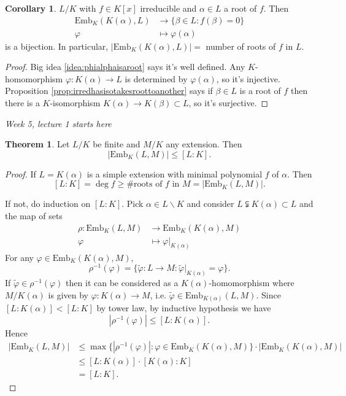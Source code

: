 \documentclass[a4paper]{article}
\newcommand{\emb}{\text{Emb}}
\theoremstyle{definition}
\newtheorem{thm}[defn]{Theorem}
\newtheorem{coro}[defn]{Corollary}
\begin{document}
\begin{coro}
\label{coro:1to1ofembeddingsroots}
$L/K$ with $f\in K[x]$ irreducible and $\alpha\in L$ a root of $f$. Then
\[
\begin{aligned}
\emb_K(K(\alpha),L)&\rightarrow \{\beta\in L:f(\beta)=0\} \\
\varphi&\mapsto\varphi(\alpha)
\end{aligned}
\]
is a bijection. In particular, $|\emb_K(K(\alpha),L)|=$ number of roots of $f$ in $L$.
\end{coro}
\begin{proof}
Big idea \ref{idea:phialphaisaroot} says it's well defined. Any $K$-homomorphism $\varphi:K(\alpha)\rightarrow L$ is determined by $\varphi(\alpha)$, so it's injective. Proposition \ref{prop:irredhasisotakesroottoanother} says if $\beta\in L$ is a root of $f$ then there is a $K$-isomorphism $K(\alpha)\rightarrow K(\beta)\subset L$, so it's surjective.
\end{proof}

\begin{flushright}
\textit{Week 5, lecture 1 starts here}
\end{flushright}

\begin{thm}
Let $L/K$ be finite and $M/K$ any extension. Then
\[
|\emb_K(L,M)|\leq [L:K].
\]
\end{thm}
\begin{proof}
If $L=K(\alpha)$ is a simple extension with minimal polynomial $f$ of $\alpha$. Then
\[
[L:K]=\deg f\geq \# \text{roots of }f\text{ in }M=|\emb_K(L,M)|.
\]

If not, do induction on $[L:K]$. Pick $\alpha\in L\backslash K$ and consider $L\subsetneqq K(\alpha)\subset L$ and the map of sets
\[
\begin{aligned}
\rho:\emb_K(L,M)&\rightarrow \emb_K (K(\alpha),M) \\
\varphi &\mapsto \varphi|_{K(\alpha)}
\end{aligned}
\]
For any $\varphi\in\emb_K(K(\alpha),M)$,
\[
\rho^{-1}(\varphi)=\{\tilde \varphi:L\rightarrow M:\tilde\varphi|_{K(\alpha)}=\varphi\}.
\]
If $\tilde \varphi\in\rho^{-1}(\varphi)$ then it can be considered as a $K(\alpha)$-homomorphism where $M/K(\alpha)$ is given by $\varphi:K(\alpha)\rightarrow M$, i.e. $\tilde \varphi\in \emb_{K(\alpha)}(L,M)$. Since $[L:K(\alpha)]<[L:K]$ by tower law, by inductive hypothesis we have
\[
|\rho^{-1}(\varphi)| \leq [L:K(\alpha)].
\]
Hence
\[
\begin{aligned}
|\emb_K(L,M)|&\leq \max \{|\rho^{-1}(\varphi)|:\varphi\in\emb_K(K(\alpha),M)\} \cdot |\emb_K(K(\alpha),M)| \\
&\leq [L:K(\alpha)] \cdot [K(\alpha):K]\\
&=[L:K].
\end{aligned}
\]
\end{proof}
\end{document}
